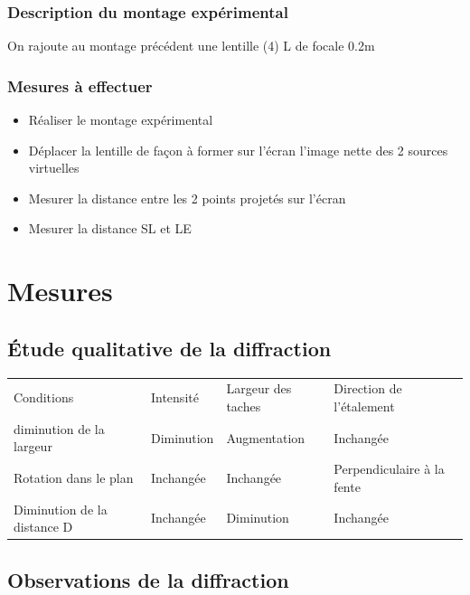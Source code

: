 \documentclass[a4paper,10pt,french]{scrartcl}
\begin{document}
\subsubsection{Description du montage expérimental}
On rajoute au montage précédent une lentille (4) L de focale 0.2m
\subsubsection{Mesures à effectuer}
\begin{itemize}
\item Réaliser le montage expérimental
\item Déplacer la lentille de façon à former sur l'écran l'image nette des 2 sources virtuelles
\item Mesurer la distance entre les 2 points projetés sur l'écran
\item Mesurer la distance SL et LE
\end{itemize}
\section{Mesures}
\subsection{Étude qualitative de la diffraction}
\begin{center}
\begin{tabular}{llll}
Conditions & Intensité & Largeur des taches & Direction de l'étalement\\
diminution de la largeur & Diminution & Augmentation & Inchangée\\
Rotation dans le plan & Inchangée & Inchangée & Perpendiculaire à la fente\\
Diminution de la distance D & Inchangée & Diminution & Inchangée
\end{tabular}
\end{center}

\subsection{Observations de la diffraction}
\end{document}
